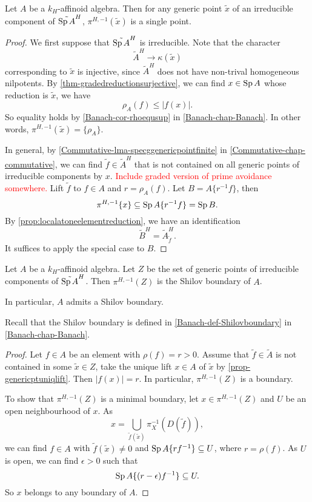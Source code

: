 \begin{proposition}\label{prop-genericptuniqlift}
    Let $A$ be a $k_H$-affinoid algebra. Then for any generic point $\tilde{x}$ of an irreducible component of $\tilde{\operatorname{Sp} A}^H$, $\pi^{H,-1}(\tilde{x})$ is a single point.
\end{proposition}
\begin{proof}
    We first suppose that $\tilde{\operatorname{Sp} A}^H$ is irreducible. Note that the character
    \[
        \tilde{A}^H\rightarrow \kappa(\tilde{x})  
    \]
    corresponding to $\tilde{x}$ is injective, since $\tilde{A}^H$ does not have non-trival homogeneous nilpotents. By \cref{thm-gradedreductionsurjective}, we can find $x\in \operatorname{Sp} A$ whose reduction is $\tilde{x}$, we have
    \[
        \rho_A(f)\leq |f(x)|.  
    \]
    So equality holds by \cref{Banach-cor-rhoequsup} in \cref{Banach-chap-Banach}. In other words, $\pi^{H,-1}(\tilde{x})=\{\rho_A\}$.

    In general, by \cref{Commutative-lma-specggenericpointfinite} in \cref{Commutative-chap-commutative}, we can find $\tilde{f}\in \tilde{A}^H$ that is not contained on all generic points of irreducible components by $x$. \textcolor{red}{Include graded version of prime avoidance somewhere.} Lift $\tilde{f}$ to $f\in A$ and $r=\rho_A(f)$. Let $B=A\{r^{-1}f\}$, then
    \[
        \pi^{H,-1}\{x\}\subseteq \operatorname{Sp} A\{r^{-1}f\}=\operatorname{Sp} B.  
    \]
    By \cref{prop:localatoneelementreduction}, we have an identification
    \[
        \tilde{B}^H=\tilde{A}^H_{\tilde{f}}.  
    \]
    It suffices to apply the special case to $B$.
\end{proof}

\begin{proposition}
    Let $A$ be a $k_H$-affinoid algebra. Let $Z$ be the set of generic points of irreducible components of $\tilde{\operatorname{Sp} A}^H$. Then $\pi^{H,-1}(Z)$ is the Shilov boundary of $A$.

    In particular, $A$ admits a Shilov boundary.
\end{proposition}
Recall that the  Shilov boundary is defined in \cref{Banach-def-Shilovboundary} in \cref{Banach-chap-Banach}.

\begin{proof}
    Let $f\in A$ be an element with $\rho(f)=r>0$. Assume that $\tilde{f}\in \tilde{A}$ is not contained in some $\tilde{x}\in Z$, take the unique lift $x\in A$ of $\tilde{x}$ by \cref{prop-genericptuniqlift}. Then $|f(x)|=r$. In particular, $\pi^{H,-1}(Z)$ is a boundary.

    To show that $\pi^{H,-1}(Z)$ is a minimal boundary, let $x\in \pi^{H,-1}(Z)$ and $U$ be an open neighbourhood of $x$. As
    \[
        x=\bigcup_{\tilde{f}(\tilde{x})} \pi_X^{-1}(D(\tilde{f})),  
    \]
    we can find $f\in A$ with $\tilde{f}(\tilde{x})\neq 0$ and $\operatorname{Sp} A\{rf^{-1}\}\subseteq U$, where $r=\rho(f)$. As $U$ is open, we can find $\epsilon>0$ such that 
    \[
        \operatorname{Sp} A\{(r-\epsilon)f^{-1}\}\subseteq U.
    \] 
    So $x$ belongs to any boundary of $A$.

\end{proof}


